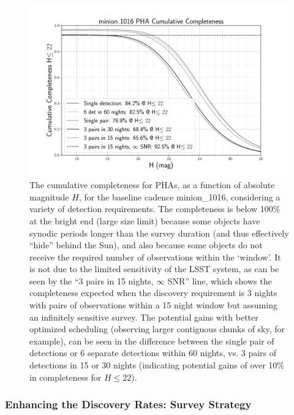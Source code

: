 \begin{figure}[t!]
\centering
\includegraphics[width=0.99\textwidth]{figures/minion_1016_pha_More_Cumulative_Completeness}
\vskip -0.2in
\caption{The cumulative completeness for PHAs, as a function of absolute magnitude $H$, for the baseline
cadence minion\_1016, considering a variety of detection requirements. The completeness is below 100\% at the bright end (large size limit) because some objects have
synodic periods longer than the survey duration (and thus effectively ``hide'' behind the Sun), and also because some objects do not receive the required number of observations within the `window'. It is not due to the limited sensitivity of the LSST system, as can be seen by the ``3 pairs in 15 nights, $\infty$ SNR'' line, which shows the completeness expected when the discovery requirement is 3 nights with pairs of observations within a 15 night window but assuming an infinitely sensitive survey. The potential gains with better optimized scheduling (observing larger contiguous chunks of sky, for example), can be seen in the difference between the single pair of detections or 6 separate detections within 60 nights, vs. 3 pairs of detections in 15 or 30 nights (indicating potential gains of over 10\% in completeness for $H\le22$). \label{fig:more_completeness}}
\end{figure}

\subsubsection{Enhancing the Discovery Rates: Survey Strategy}

